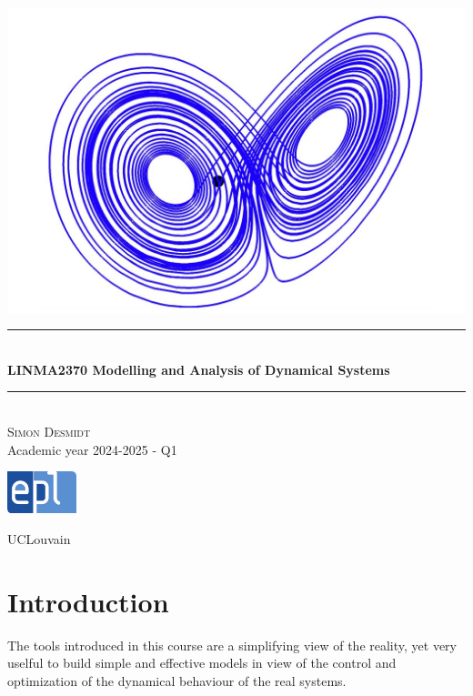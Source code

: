 \documentclass[12pt, openany]{report}
\theoremstyle{definition}
\newcommand{\HRule}{\rule{\linewidth}{0.5mm}}
\begin{document}
\begin{titlepage}
    \begin{sffamily}
    \begin{center}
        \includegraphics[scale=0.25]{img/page_de_garde.png} \\[1cm]
        \HRule \\[0.4cm]
        { \huge \bfseries LINMA2370 Modelling and Analysis of Dynamical Systems \\[0.4cm] }
    
        \HRule \\[1.5cm]
        \textsc{\LARGE Simon Desmidt}\\[1cm]
        \vfill
        \vspace{2cm}
        {\large Academic year 2024-2025 - Q1}
        \vspace{0.4cm}
         
        \includegraphics[width=0.15\textwidth]{img/epl.png}
        
        UCLouvain\\
    
    \end{center}
    \end{sffamily}
\end{titlepage}

\setcounter{tocdepth}{1}
\tableofcontents
\chapter{Introduction}
The tools introduced in this course are a simplifying view of the reality, yet very uselful to build simple and effective models in view of the control and optimization of the dynamical behaviour of the real systems.
\end{document}
